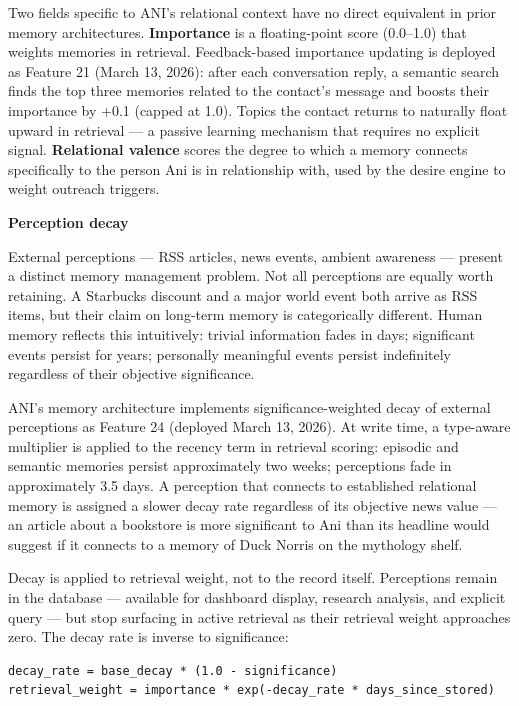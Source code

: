 \documentclass[12pt]{article}
\begin{document}
Two fields specific to ANI's relational context have no direct
equivalent in prior memory architectures. \textbf{Importance} is a
floating-point score (0.0--1.0) that weights memories in retrieval.
Feedback-based importance updating is deployed as Feature 21 (March 13,
2026): after each conversation reply, a semantic search finds the top
three memories related to the contact's message and boosts their
importance by +0.1 (capped at 1.0). Topics the contact returns to
naturally float upward in retrieval --- a passive learning mechanism
that requires no explicit signal. \textbf{Relational valence} scores the
degree to which a memory connects specifically to the person Ani is in
relationship with, used by the desire engine to weight outreach
triggers.

\textbf{Perception decay}

External perceptions --- RSS articles, news events, ambient awareness
--- present a distinct memory management problem. Not all perceptions
are equally worth retaining. A Starbucks discount and a major world
event both arrive as RSS items, but their claim on long-term memory is
categorically different. Human memory reflects this intuitively: trivial
information fades in days; significant events persist for years;
personally meaningful events persist indefinitely regardless of their
objective significance.

ANI's memory architecture implements significance-weighted decay of
external perceptions as Feature 24 (deployed March 13, 2026). At write
time, a type-aware multiplier is applied to the recency term in
retrieval scoring: episodic and semantic memories persist approximately
two weeks; perceptions fade in approximately 3.5 days. A perception that
connects to established relational memory is assigned a slower decay
rate regardless of its objective news value --- an article about a
bookstore is more significant to Ani than its headline would suggest if
it connects to a memory of Duck Norris on the mythology shelf.

Decay is applied to retrieval weight, not to the record itself.
Perceptions remain in the database --- available for dashboard display,
research analysis, and explicit query --- but stop surfacing in active
retrieval as their retrieval weight approaches zero. The decay rate is
inverse to significance:

\begin{verbatim}
decay_rate = base_decay * (1.0 - significance)
retrieval_weight = importance * exp(-decay_rate * days_since_stored)
\end{verbatim}
\end{document}
